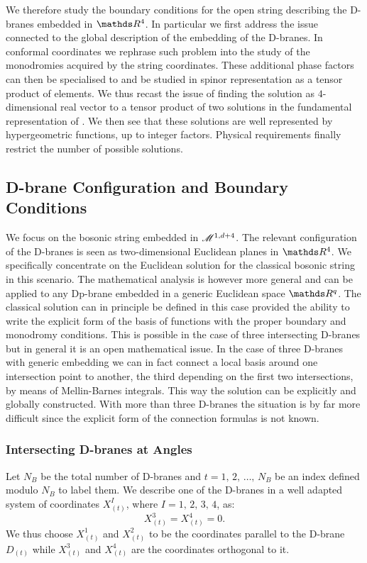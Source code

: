We therefore study the boundary conditions for the open string describing the D-branes embedded in $\R^4$.
In particular we first address the issue connected to the global description of the embedding of the D-branes.
In conformal coordinates we rephrase such problem into the study of the monodromies acquired by the string coordinates.
These additional phase factors can then be specialised to  and be studied in spinor representation as a tensor product of  elements.
We thus recast the issue of finding the solution as $4$-dimensional real vector to a tensor product of two solutions in the fundamental representation of .
We then see that these solutions are well represented by hypergeometric functions, up to integer factors.
Physical requirements finally restrict the number of possible solutions.


\subsection{D-brane Configuration and Boundary Conditions}

We focus on the bosonic string embedded in $\mathscr{M}^{1, d + 4}$.
The relevant configuration of the D-branes is seen as two-dimensional Euclidean planes in $\R^4$.
We specifically concentrate on the Euclidean solution for the classical bosonic string in this scenario.
The mathematical analysis is however more general and can be applied to any Dp-brane embedded in a generic Euclidean space $\R^q$.
The classical solution can in principle be defined in this case provided the ability to write the explicit form of the basis of functions with the proper boundary and monodromy conditions.
This is possible in the case of three intersecting D-branes but in general it is an open mathematical issue.
In the case of three D-branes with generic embedding we can in fact connect a local basis around one intersection point to another, the third depending on the first two intersections, by means of Mellin-Barnes integrals.
This way the solution can be explicitly and globally constructed.
With more than three D-branes the situation is by far more difficult since the explicit form of the connection formulas is not known.


\subsubsection{Intersecting D-branes at Angles}

Let $N_B$ be the total number of D-branes and $t = 1,\, 2,\, \dots,\, N_B$ be
an index defined modulo $N_B$ to label them.
We describe one of the D-branes in a well adapted system of coordinates
$X_{(t)}^I$, where $I = 1,\, 2,\, 3,\, 4$, as:
\begin{equation}
  X_{(t)}^3 = X_{(t)}^4 = 0.
  \label{eq:well-adapt-embed}
\end{equation}
We thus choose $X_{(t)}^1$ and $X_{(t)}^2$ to be the coordinates parallel to the D-brane $D_{(t)}$ while $X_{(t)}^3$ and $X_{(t)}^4$ are the coordinates orthogonal to it.


